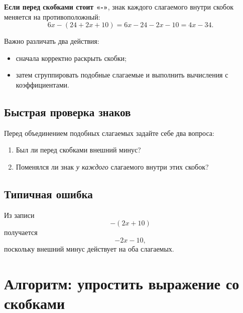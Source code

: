 \documentclass[a4paper,12pt]{article}
\newcommand{\key}[1]{\textcolor{darkaccent}{\textbf{#1}}}
\begin{document}
\key{Если перед скобками стоит «-»}, знак каждого слагаемого внутри скобок
меняется на противоположный:
\[
6x-(24+2x+10)
=
6x-24-2x-10
=
4x-34.
\]

Важно различать два действия:
\begin{itemize}
  \item сначала корректно раскрыть скобки;
  \item затем сгруппировать подобные слагаемые и выполнить вычисления
        с коэффициентами.
\end{itemize}

\subsection*{Быстрая проверка знаков}

Перед объединением подобных слагаемых задайте себе два вопроса:
\begin{enumerate}
  \item Был ли перед скобками внешний минус?
  \item Поменялся ли знак \emph{у каждого} слагаемого внутри этих скобок?
\end{enumerate}

\subsection*{Типичная ошибка}

Из записи
\[
-(2x+10)
\]
получается
\[
-2x-10,
\]
поскольку внешний минус действует на оба слагаемых.

\clearpage

\section*{Алгоритм: упростить выражение со скобками}
\end{document}

